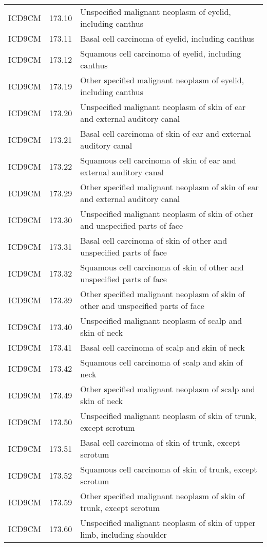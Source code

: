\begin{longtable}{p{}p{}p{}}
  ICD9CM & 173.10 & Unspecified malignant neoplasm of eyelid, including canthus \\ 
  ICD9CM & 173.11 & Basal cell carcinoma of eyelid, including canthus \\ 
  ICD9CM & 173.12 & Squamous cell carcinoma of eyelid, including canthus \\ 
  ICD9CM & 173.19 & Other specified malignant neoplasm of eyelid, including canthus \\ 
  ICD9CM & 173.20 & Unspecified malignant neoplasm of skin of ear and external auditory canal \\ 
  ICD9CM & 173.21 & Basal cell carcinoma of skin of ear and external auditory canal \\ 
  ICD9CM & 173.22 & Squamous cell carcinoma of skin of ear and external auditory canal \\ 
  ICD9CM & 173.29 & Other specified malignant neoplasm of skin of ear and external auditory canal \\ 
  ICD9CM & 173.30 & Unspecified malignant neoplasm of skin of other and unspecified parts of face \\ 
  ICD9CM & 173.31 & Basal cell carcinoma of skin of other and unspecified parts of face \\ 
  ICD9CM & 173.32 & Squamous cell carcinoma of skin of other and unspecified parts of face \\ 
  ICD9CM & 173.39 & Other specified malignant neoplasm of skin of other and unspecified parts of face \\ 
  ICD9CM & 173.40 & Unspecified malignant neoplasm of scalp and skin of neck \\ 
  ICD9CM & 173.41 & Basal cell carcinoma of scalp and skin of neck \\ 
  ICD9CM & 173.42 & Squamous cell carcinoma of scalp and skin of neck \\ 
  ICD9CM & 173.49 & Other specified malignant neoplasm of scalp and skin of neck \\ 
  ICD9CM & 173.50 & Unspecified malignant neoplasm of skin of trunk, except scrotum \\ 
  ICD9CM & 173.51 & Basal cell carcinoma of skin of trunk, except scrotum \\ 
  ICD9CM & 173.52 & Squamous cell carcinoma of skin of trunk, except scrotum \\ 
  ICD9CM & 173.59 & Other specified malignant neoplasm of skin of trunk, except scrotum \\ 
  ICD9CM & 173.60 & Unspecified malignant neoplasm of skin of upper limb, including shoulder \\ 

\end{longtable}
